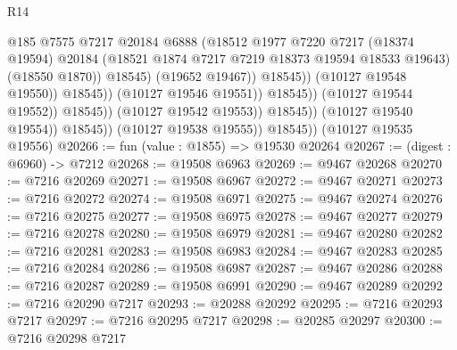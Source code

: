\begin{lexlean}{R14}
\begin{coremodule}
                                                @185
                                                @7575
                                                @7217
                                                @20184
                                                @6888
                                                (@18512
                                                  @1977
                                                  @7220
                                                  @7217
                                                  (@18374 @19594)
                                                  @20184
                                                  (@18521
                                                    @1874
                                                    @7217
                                                    @7219
                                                    @18373
                                                    @19594
                                                    @18533
                                                    @19643)
                                                  (@18550 @1870))
                                                @18545)
                                              (@19652 @19467))
                                            @18545))
                                        (@10127 @19548 @19550))
                                      @18545))
                                  (@10127 @19546 @19551))
                                @18545))
                            (@10127 @19544 @19552))
                          @18545))
                      (@10127 @19542 @19553))
                    @18545))
                (@10127 @19540 @19554))
              @18545))
          (@10127 @19538 @19555))
        @18545))
    (@10127 @19535 @19556)
@20266 := fun (value : @1855) => @19530 @20264
@20267 := (digest : @6960) -> @7212
@20268 := @19508 @6963
@20269 := @9467 @20268
@20270 := @7216 @20269
@20271 := @19508 @6967
@20272 := @9467 @20271
@20273 := @7216 @20272
@20274 := @19508 @6971
@20275 := @9467 @20274
@20276 := @7216 @20275
@20277 := @19508 @6975
@20278 := @9467 @20277
@20279 := @7216 @20278
@20280 := @19508 @6979
@20281 := @9467 @20280
@20282 := @7216 @20281
@20283 := @19508 @6983
@20284 := @9467 @20283
@20285 := @7216 @20284
@20286 := @19508 @6987
@20287 := @9467 @20286
@20288 := @7216 @20287
@20289 := @19508 @6991
@20290 := @9467 @20289
@20292 := @7216 @20290 @7217
@20293 := @20288 @20292
@20295 := @7216 @20293 @7217
@20297 := @7216 @20295 @7217
@20298 := @20285 @20297
@20300 := @7216 @20298 @7217

\end{coremodule}
\end{lexlean}
